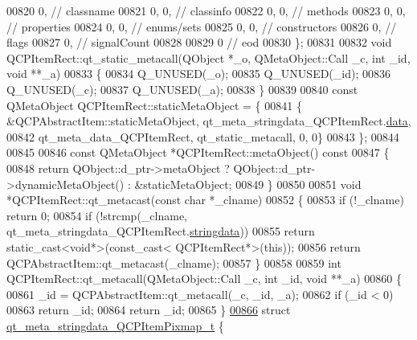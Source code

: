 \begin{DoxyCode}
00820        0,       \textcolor{comment}{// classname}
00821        0,    0, \textcolor{comment}{// classinfo}
00822        0,    0, \textcolor{comment}{// methods}
00823        0,    0, \textcolor{comment}{// properties}
00824        0,    0, \textcolor{comment}{// enums/sets}
00825        0,    0, \textcolor{comment}{// constructors}
00826        0,       \textcolor{comment}{// flags}
00827        0,       \textcolor{comment}{// signalCount}
00828 
00829        0        \textcolor{comment}{// eod}
00830 \};
00831 
00832 \textcolor{keywordtype}{void} QCPItemRect::qt\_static\_metacall(QObject *\_o, QMetaObject::Call \_c, \textcolor{keywordtype}{int} \_id, \textcolor{keywordtype}{void} **\_a)
00833 \{
00834     Q\_UNUSED(\_o);
00835     Q\_UNUSED(\_id);
00836     Q\_UNUSED(\_c);
00837     Q\_UNUSED(\_a);
00838 \}
00839 
00840 \textcolor{keyword}{const} QMetaObject QCPItemRect::staticMetaObject = \{
00841     \{ &QCPAbstractItem::staticMetaObject, qt\_meta\_stringdata\_QCPItemRect.\hyperlink{a00016_abb87c72758ddd18aa3c36a7ee960fa1f}{data},
00842       qt\_meta\_data\_QCPItemRect,  qt\_static\_metacall, 0, 0\}
00843 \};
00844 
00845 
00846 \textcolor{keyword}{const} QMetaObject *QCPItemRect::metaObject()\textcolor{keyword}{ const}
00847 \textcolor{keyword}{}\{
00848     \textcolor{keywordflow}{return} QObject::d\_ptr->metaObject ? QObject::d\_ptr->dynamicMetaObject() : &staticMetaObject;
00849 \}
00850 
00851 \textcolor{keywordtype}{void} *QCPItemRect::qt\_metacast(\textcolor{keyword}{const} \textcolor{keywordtype}{char} *\_clname)
00852 \{
00853     \textcolor{keywordflow}{if} (!\_clname) \textcolor{keywordflow}{return} 0;
00854     \textcolor{keywordflow}{if} (!strcmp(\_clname, qt\_meta\_stringdata\_QCPItemRect.\hyperlink{a00016_a8006d9df79f24f9dc9846ce4485c145a}{stringdata}))
00855         \textcolor{keywordflow}{return} \textcolor{keyword}{static\_cast<}\textcolor{keywordtype}{void}*\textcolor{keyword}{>}(\textcolor{keyword}{const\_cast<} QCPItemRect*\textcolor{keyword}{>}(\textcolor{keyword}{this}));
00856     \textcolor{keywordflow}{return} QCPAbstractItem::qt\_metacast(\_clname);
00857 \}
00858 
00859 \textcolor{keywordtype}{int} QCPItemRect::qt\_metacall(QMetaObject::Call \_c, \textcolor{keywordtype}{int} \_id, \textcolor{keywordtype}{void} **\_a)
00860 \{
00861     \_id = QCPAbstractItem::qt\_metacall(\_c, \_id, \_a);
00862     \textcolor{keywordflow}{if} (\_id < 0)
00863         \textcolor{keywordflow}{return} \_id;
00864     \textcolor{keywordflow}{return} \_id;
00865 \}
\hypertarget{a00016_source_l00866}{}\hyperlink{a00016}{00866} \textcolor{keyword}{struct }\hyperlink{a00016_dd/d42/a00109}{qt\_meta\_stringdata\_QCPItemPixmap\_t} \{

\end{DoxyCode}
